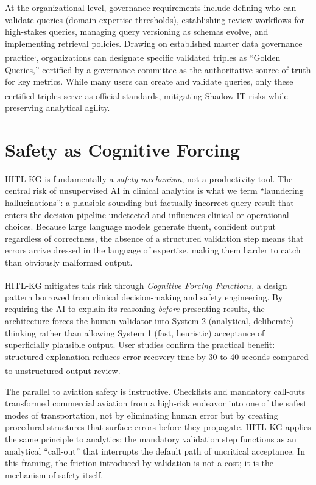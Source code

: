 \documentclass[
  american,
  11pt,
  letterpaper,
  oneside  ,captions=tableheading
]{scrartcl}
\begin{document}
At the organizational level, governance requirements include defining
who can validate queries (domain expertise thresholds), establishing
review workflows for high-stakes queries, managing query versioning as
schemas evolve, and implementing retrieval policies. Drawing on
established master data governance
practice\textsuperscript{,},
organizations can designate specific validated triples as ``Golden
Queries,'' certified by a governance committee as the authoritative
source of truth for key metrics. While many users can create and
validate queries, only these certified triples serve as official
standards, mitigating Shadow IT
risks\textsuperscript{} while
preserving analytical agility.

\section{Safety as Cognitive Forcing}\label{safety-as-cognitive-forcing}

HITL-KG is fundamentally a \emph{safety mechanism}, not a productivity
tool. The central risk of unsupervised AI in clinical analytics is what
we term ``laundering hallucinations'': a plausible-sounding but
factually incorrect query result that enters the decision pipeline
undetected and influences clinical or operational choices. Because large
language models generate fluent, confident output regardless of
correctness, the absence of a structured validation step means that
errors arrive dressed in the language of expertise, making them harder
to catch than obviously malformed output.

HITL-KG mitigates this risk through \emph{Cognitive Forcing
Functions}\textsuperscript{}, a design
pattern borrowed from clinical decision-making and safety engineering.
By requiring the AI to explain its reasoning \emph{before} presenting
results, the architecture forces the human validator into System 2
(analytical, deliberate) thinking rather than allowing System 1 (fast,
heuristic) acceptance of superficially plausible output. User studies
confirm the practical benefit: structured explanation reduces error
recovery time by 30 to 40 seconds compared to unstructured output
review\textsuperscript{}.

The parallel to aviation safety is instructive. Checklists and mandatory
call-outs transformed commercial aviation from a high-risk endeavor into
one of the safest modes of transportation, not by eliminating human
error but by creating procedural structures that surface errors before
they propagate. HITL-KG applies the same principle to analytics: the
mandatory validation step functions as an analytical ``call-out'' that
interrupts the default path of uncritical acceptance. In this framing,
the friction introduced by validation is not a cost; it is the mechanism
of safety itself.
\end{document}
